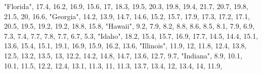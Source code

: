 \documentclass[
]{book}
\newenvironment{Shaded}{\begin{snugshade}}{\end{snugshade}}
\newcommand{\DecValTok}[1]{\textcolor[rgb]{0.00,0.00,0.81}{#1}}
\newcommand{\FloatTok}[1]{\textcolor[rgb]{0.00,0.00,0.81}{#1}}
\newcommand{\NormalTok}[1]{#1}
\newcommand{\StringTok}[1]{\textcolor[rgb]{0.31,0.60,0.02}{#1}}
\begin{document}
\begin{Shaded}
\begin{Highlighting}[]
               \StringTok{"Florida"}\NormalTok{, }\FloatTok{17.4}\NormalTok{, }\FloatTok{16.2}\NormalTok{, }\FloatTok{16.9}\NormalTok{, }\FloatTok{15.6}\NormalTok{,   }\DecValTok{17}\NormalTok{, }\FloatTok{18.3}\NormalTok{, }\FloatTok{19.5}\NormalTok{, }\FloatTok{20.3}\NormalTok{, }\FloatTok{19.8}\NormalTok{, }\FloatTok{19.4}\NormalTok{, }\FloatTok{21.7}\NormalTok{, }\FloatTok{20.7}\NormalTok{, }\FloatTok{19.8}\NormalTok{, }\FloatTok{21.5}\NormalTok{,   }\DecValTok{20}\NormalTok{, }\FloatTok{16.6}\NormalTok{,}
               \StringTok{"Georgia"}\NormalTok{, }\FloatTok{14.2}\NormalTok{, }\FloatTok{13.9}\NormalTok{, }\FloatTok{14.7}\NormalTok{, }\FloatTok{14.6}\NormalTok{, }\FloatTok{15.2}\NormalTok{, }\FloatTok{15.7}\NormalTok{, }\FloatTok{17.9}\NormalTok{, }\FloatTok{17.3}\NormalTok{, }\FloatTok{17.2}\NormalTok{, }\FloatTok{17.1}\NormalTok{, }\FloatTok{20.5}\NormalTok{, }\FloatTok{19.5}\NormalTok{, }\FloatTok{19.2}\NormalTok{, }\FloatTok{19.2}\NormalTok{, }\FloatTok{18.8}\NormalTok{, }\FloatTok{15.8}\NormalTok{,}
                \StringTok{"Hawaii"}\NormalTok{,  }\FloatTok{9.2}\NormalTok{,  }\FloatTok{7.9}\NormalTok{,  }\FloatTok{8.2}\NormalTok{,  }\FloatTok{8.8}\NormalTok{,  }\FloatTok{8.6}\NormalTok{,  }\FloatTok{8.5}\NormalTok{,  }\FloatTok{8.1}\NormalTok{,  }\FloatTok{7.9}\NormalTok{,  }\FloatTok{6.9}\NormalTok{,  }\FloatTok{7.3}\NormalTok{,  }\FloatTok{7.4}\NormalTok{,  }\FloatTok{7.7}\NormalTok{,  }\FloatTok{7.8}\NormalTok{,  }\FloatTok{7.7}\NormalTok{,  }\FloatTok{6.7}\NormalTok{,  }\FloatTok{5.3}\NormalTok{,}
                 \StringTok{"Idaho"}\NormalTok{, }\FloatTok{18.2}\NormalTok{, }\FloatTok{15.4}\NormalTok{, }\FloatTok{15.7}\NormalTok{, }\FloatTok{16.9}\NormalTok{, }\FloatTok{17.7}\NormalTok{, }\FloatTok{14.5}\NormalTok{, }\FloatTok{14.4}\NormalTok{, }\FloatTok{15.1}\NormalTok{, }\FloatTok{13.6}\NormalTok{, }\FloatTok{15.4}\NormalTok{, }\FloatTok{15.1}\NormalTok{, }\FloatTok{19.1}\NormalTok{, }\FloatTok{16.9}\NormalTok{, }\FloatTok{15.9}\NormalTok{, }\FloatTok{16.2}\NormalTok{, }\FloatTok{13.6}\NormalTok{,}
              \StringTok{"Illinois"}\NormalTok{, }\FloatTok{11.9}\NormalTok{,   }\DecValTok{12}\NormalTok{, }\FloatTok{11.8}\NormalTok{, }\FloatTok{12.4}\NormalTok{, }\FloatTok{13.8}\NormalTok{, }\FloatTok{12.5}\NormalTok{, }\FloatTok{13.2}\NormalTok{, }\FloatTok{13.5}\NormalTok{,   }\DecValTok{13}\NormalTok{, }\FloatTok{12.2}\NormalTok{, }\FloatTok{14.2}\NormalTok{, }\FloatTok{14.8}\NormalTok{, }\FloatTok{14.7}\NormalTok{, }\FloatTok{13.6}\NormalTok{, }\FloatTok{12.7}\NormalTok{,  }\FloatTok{9.7}\NormalTok{,}
               \StringTok{"Indiana"}\NormalTok{,  }\FloatTok{8.9}\NormalTok{, }\FloatTok{10.1}\NormalTok{, }\FloatTok{10.1}\NormalTok{, }\FloatTok{11.5}\NormalTok{, }\FloatTok{12.2}\NormalTok{, }\FloatTok{12.4}\NormalTok{, }\FloatTok{13.1}\NormalTok{, }\FloatTok{11.3}\NormalTok{,   }\DecValTok{11}\NormalTok{, }\FloatTok{11.3}\NormalTok{, }\FloatTok{13.7}\NormalTok{, }\FloatTok{13.4}\NormalTok{,   }\DecValTok{12}\NormalTok{, }\FloatTok{13.4}\NormalTok{,   }\DecValTok{14}\NormalTok{, }\FloatTok{11.9}\NormalTok{,}

\end{Highlighting}
\end{Shaded}
\end{document}
